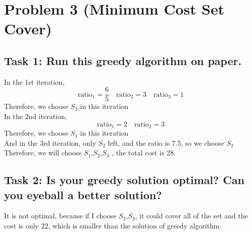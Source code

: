 \documentclass[a4paper,12pt]{journal}
\begin{document}
	\section*{Problem 3 (Minimum Cost Set Cover)}
	\subsection*{Task 1: Run this greedy algorithm on paper.}
	In the 1st iteration, 
	$$\text{ratio}_1=\frac{6}{5}\quad\text{ratio}_2=3\quad \text{ratio}_3=1$$
	Therefore, we choose $S_3$ in this iteration\\
	In the 2nd iteration, 
	$$\text{ratio}_1=2\quad\text{ratio}_2=3$$
	Therefore, we choose $S_1$ in this iteration\\
	And in the 3rd iteration, only $S_2$ left, and the ratio is 7.5, so we choose $S_2$\\
	Therefore, we will choose $S_1$,$S_2$,$S_3$ , the total cost is 28.
	\subsection*{Task 2: Is your greedy solution optimal? Can you eyeball a better solution?}
	It is not optimal, because if I choose $S_2$,$S_3$, it could cover all of the set and the cost is only 22, which is smaller than the solution of greedy algorithm.
	
\end{document}
